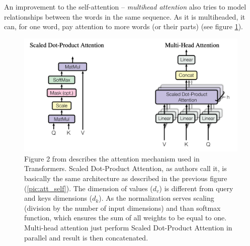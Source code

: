 An improvement to the self-attention -- \textit{multihead attention} \citep{Vaswani2017} also tries to model relationships between the words in the same sequence. As it is multiheaded, it can, for one word, pay attention to more words (or their parts) (see figure \ref{pic:att_multi}).
\begin{figure}[H]
\centering
\includegraphics[width=1\columnwidth]{../img/attention_multi1}
\caption[Attention mechanism for the Transformers architecture]{Figure 2 from \citep{Vaswani2017} describes the attention mechanism used in Transformers. Scaled Dot-Product Attention, as authors call it, is basically the same architecture as described in the previous figure (\ref{pic:att_self}). The dimension of values ($d_v$) is different from query and keys dimensions ($d_k$). As the normalization serves scaling (division by the number of input dimensions) and than softmax function, which ensures the sum of all weights to be equal to one. Multi-head attention just perform Scaled Dot-Product Attention in parallel and result is then concatenated.
}
\label{pic:att_multi}
\end{figure}
